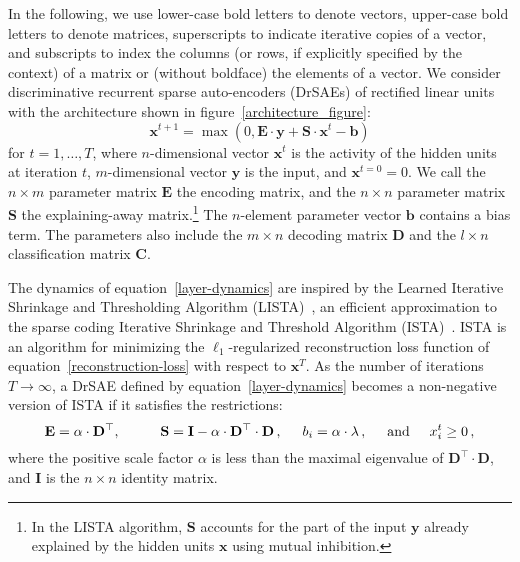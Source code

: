 \documentclass{article} %
\newcommand{\bv}{\mathbf{b}}
\newcommand{\x}{\mathbf{x}}
\newcommand{\y}{\mathbf{y}}
\newcommand{\C}{\mathbf{C}}
\newcommand{\D}{\mathbf{D}}
\newcommand{\E}{\mathbf{E}}
\newcommand{\I}{\mathbf{I}}
\newcommand{\Sm}{\mathbf{S}}
\begin{document}
In the following, we use lower-case bold letters to denote vectors, upper-case bold letters to denote matrices, superscripts to indicate iterative copies of a vector, and subscripts to index the columns (or rows, if explicitly specified by the context) of a matrix or (without boldface) the elements of a vector.
We consider discriminative recurrent sparse auto-encoders (DrSAEs) of rectified linear units with the architecture shown in figure~\ref{architecture_figure}: %
\begin{equation} \label{layer-dynamics}
\x^{t+1} = \max\left(0, \E \cdot \y + \Sm \cdot \x^t - \bv \right)
\end{equation}
for $t = 1, \ldots, T$, where $n$-dimensional vector $\x^t$ is the activity of the hidden units at iteration $t$, %
$m$-dimensional vector $\y$ is the input, and $\x^{t=0} = 0$.  We call the $n \times m$ parameter matrix $\E$ the encoding matrix, and the $n \times n$ parameter matrix $\Sm$ the explaining-away matrix.\footnote{In the LISTA algorithm, $\Sm$ accounts for the part of the input $\y$ already explained by the hidden units $\x$ using mutual inhibition.}  The $n$-element parameter vector $\bv$ contains a bias term.  The parameters also include the $m \times n$ decoding matrix $\D$ and the $l \times n$ classification matrix $\C$.

The dynamics of equation~\ref{layer-dynamics} are inspired by the Learned Iterative Shrinkage and Thresholding Algorithm (LISTA)~\citep{gregor2010}, an efficient approximation to the sparse coding Iterative Shrinkage and Threshold Algorithm (ISTA)~\citep{daubechies2004}.
ISTA is an %
algorithm for minimizing the $\ell_1$-regularized reconstruction loss function of equation~\ref{reconstruction-loss} %
with respect to $\x^T$. %
As the number of iterations $T \rightarrow \infty$, a DrSAE defined by equation~\ref{layer-dynamics} becomes a non-negative version of ISTA if it satisfies the restrictions:
\begin{equation} \label{ISTA-restriction}
\E = \alpha \cdot \D^{\top} , \hspace{1cm}
\Sm = \I - \alpha \cdot \D^{\top} \cdot \D \, , \hspace{0.5cm}
b_i= \alpha \cdot \lambda \, , \hspace{0.5cm} %
\text{and} \hspace{0.5cm} x_i^t \geq 0 \, ,
\end{equation}
where the positive scale factor $\alpha$ is less than the maximal eigenvalue of $\D^{\top} \cdot \D$, and $\I$ is the $n \times n$ identity matrix.
\end{document}
